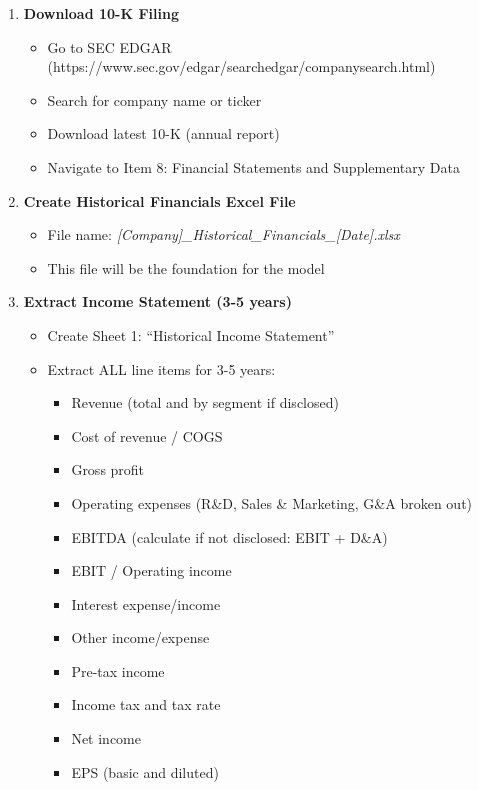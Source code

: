 \documentclass[11pt]{article}
\begin{document}
\begin{enumerate}[leftmargin=*,itemsep=2pt,topsep=2pt]
\item {} \textbf{Download 10-K Filing}
\begin{itemize}[leftmargin=*,itemsep=2pt,topsep=2pt]
\item {} Go to SEC EDGAR (https://www.sec.gov/edgar/searchedgar/companysearch.html)
\item {} Search for company name or ticker
\item {} Download latest 10-K (annual report)
\item {} Navigate to Item 8: Financial Statements and Supplementary Data
\end{itemize}
\item {} \textbf{Create Historical Financials Excel File}
\begin{itemize}[leftmargin=*,itemsep=2pt,topsep=2pt]
\item {} File name: \emph{[Company]\_\allowbreak{}Historical\_\allowbreak{}Financials\_\allowbreak{}[Date].xlsx}
\item {} This file will be the foundation for the model
\end{itemize}
\item {} \textbf{Extract Income Statement (3-5 years)}
\begin{itemize}[leftmargin=*,itemsep=2pt,topsep=2pt]
\item {} Create Sheet 1: ``Historical Income Statement''
\item {} Extract ALL line items for 3-5 years:
\begin{itemize}[leftmargin=*,itemsep=2pt,topsep=2pt]
\item {} Revenue (total and by segment if disclosed)
\item {} Cost of revenue / COGS
\item {} Gross profit
\item {} Operating expenses (R\&D, Sales \& Marketing, G\&A broken out)
\item {} EBITDA (calculate if not disclosed: EBIT + D\&A)
\item {} EBIT / Operating income
\item {} Interest expense/income
\item {} Other income/expense
\item {} Pre-tax income
\item {} Income tax and tax rate
\item {} Net income
\item {} EPS (basic and diluted)

\end{itemize}
\end{itemize}
\end{enumerate}
\end{document}
